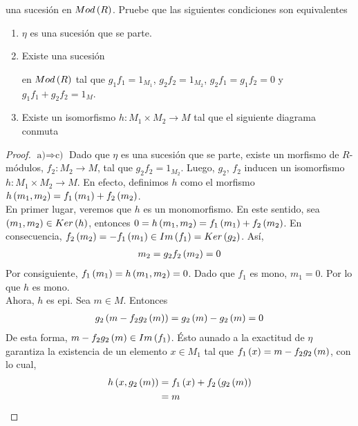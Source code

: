 \documentclass{article}
\begin{document}
\begin{enumerate}[label=\textbf{Ej \arabic*.}]
\begin{tikzcd}
		\end{tikzcd}
		una sucesión en $Mod\lrprth{R}$. Pruebe que las siguientes condiciones son equivalentes
		\begin{enumerate}
			\item $\eta$ es una sucesión que se parte.
			\item Existe una sucesión
			en $Mod\lrprth{R}$ tal que $g_{1}f_{1}=1_{M_{1}}$, $g_{2}f_{2}=1_{M_{2}}$, $g_{2}f_{1}=g_{1}f_{2}=0$ y $g_{1}f_{1}+g_{2}f_{2}=1_{M}$.
			\item Existe un isomorfismo $h:M_{1} \times M_{2} \longrightarrow M$ tal que el siguiente diagrama conmuta\\
		\end{enumerate}
		\begin{proof}
			$\boxed{\text{a)}\Rightarrow\text{c)}}$ Dado que $\eta$ es una sucesión que se parte, existe un morfismo de $R$-módulos, $f_{2}:M_{2} \longrightarrow M$, tal que $g_{2}f_{2}=1_{M_{2}}$. Luego, $g_{2}$, $f_{2}$ inducen un isomorfismo $h:M_{1} \times M_{2} \longrightarrow M$. En efecto, definimos $h$ como el morfismo $h\lrprth{m_{1},m_{2}}=f_{1}\lrprth{m_{1}}+f_{2}\lrprth{m_{2}}$.\\
			
			En primer lugar, veremos que $h$ es un monomorfismo. En este sentido, sea $\lrprth{m_{1},m_{2}} \in Ker\lrprth{h}$, entonces $0=h\lrprth{m_{1},m_{2}}=f_{1}\lrprth{m_{1}}+f_{2}\lrprth{m_{2}}$. En consecuencia, $f_{2}\lrprth{m_{2}}=-f_{1}\lrprth{m_{1}}\in Im\lrprth{f_{1}}=Ker\lrprth{g_{2}}$. Así, 
			\begin{align*}
				m_{2}=g_{2}f_{2}\lrprth{m_{2}}=0
			\end{align*}
			Por consiguiente, $f_{1}\lrprth{m_{1}}=h\lrprth{m_{1},m_{2}}=0$. Dado que $f_{1}$ es mono, $m_{1}=0$. Por lo que $h$ es mono.\\
			
			Ahora, $h$ es epi. Sea $m \in M$. Entonces 
			\begin{align*}
				g_{2}\lrprth{m-f_{2}g_{2}\lrprth{m}}=g_{2}\lrprth{m}-g_{2}\lrprth{m}=0
			\end{align*}
			De esta forma, $m-f_{2}g_{2}\lrprth{m} \in Im\lrprth{f_{1}}$. Ésto aunado a la exactitud de $\eta$ garantiza la existencia de un elemento $x \in M_{1}$ tal que $f_{1}\lrprth{x}=m-f_{2}g_{2}\lrprth{m}$, con lo cual,
			\begin{align*}
				h\lrprth{x,g_{2}\lrprth{m}}&=f_{1}\lrprth{x}+f_{2}\lrprth{g_{2}\lrprth{m}}\\
				&=m
			\end{align*}
			

\end{proof}
\end{enumerate}
\end{document}
